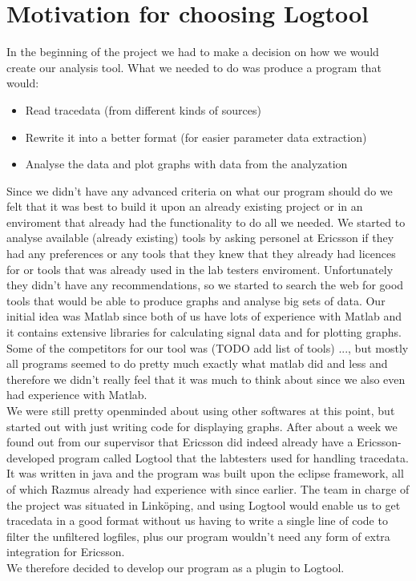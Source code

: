 \documentclass[cropmarks, frame, english]{idamasterthesis}
\begin{document}
\section{Motivation for choosing Logtool}
In the beginning of the project we had to make a decision on how we would create our analysis tool.
What we needed to do was produce a program that would:
\begin{itemize}
\item Read tracedata (from different kinds of sources)
\item Rewrite it into a better format (for easier parameter data extraction)
\item  Analyse the data and plot graphs with data from the analyzation
\end{itemize} 
Since we didn't have any advanced criteria on what our program should do we felt that it was best to build it upon an already existing project or in an enviroment that already had the functionality to do all we needed. \newline
We started to analyse available (already existing) tools by asking personel at Ericsson if they had any preferences or any tools that they knew that they already had licences for or tools that was already used in the lab testers enviroment. Unfortunately they didn't have any recommendations, so we started to search the web for good tools that would be able to produce graphs and analyse big sets of data. Our initial idea was Matlab since both of us have lots of experience with Matlab and it contains extensive libraries for calculating signal data and for plotting graphs. Some of the competitors for our tool was (TODO add list of tools) ..., but mostly all programs seemed to do pretty much exactly what matlab did and less and therefore we didn't really feel that it was much to think about since we also even had experience with Matlab. \\
We were still pretty openminded about using other softwares at this point, but started out with just writing code for displaying graphs. After about a week we found out from our supervisor that Ericsson did indeed already have a Ericsson-developed program called Logtool that the labtesters used for handling tracedata. It was written in java and the program was built upon the eclipse framework, all of which Razmus already had experience with since earlier. The team in charge of the project was situated in Linköping, and using Logtool would enable us to get tracedata in a good format without us having to write a single line of code to filter the unfiltered logfiles, plus our program wouldn't need any form of extra integration for Ericsson.\\
 We therefore decided to develop our program as a plugin to Logtool. 
 
\end{document}
